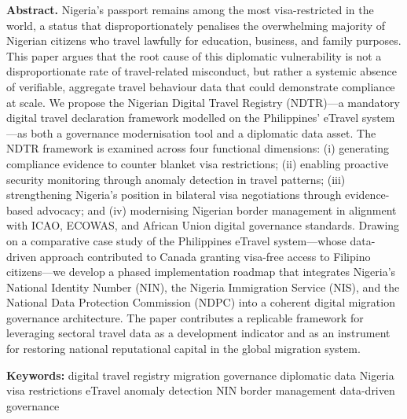 \documentclass[11pt]{article}
\begin{document}
\noindent\colorbox{primary-blue!7}{%
\begin{minipage}{\dimexpr\textwidth-2\fboxsep}
\vspace{6pt}
\textbf{\color{primary-blue}Abstract.}\quad
Nigeria's passport remains among the most visa-restricted in the world, a status that
disproportionately penalises the overwhelming majority of Nigerian citizens who travel
lawfully for education, business, and family purposes.
This paper argues that the root cause of this diplomatic vulnerability is not a
disproportionate rate of travel-related misconduct, but rather a systemic absence of
verifiable, aggregate travel behaviour data that could demonstrate compliance at scale.
We propose the Nigerian Digital Travel Registry (NDTR)---a mandatory digital travel
declaration framework modelled on the Philippines' eTravel system---as both a governance
modernisation tool and a diplomatic data asset.
The NDTR framework is examined across four functional dimensions:
(i) generating compliance evidence to counter blanket visa restrictions;
(ii) enabling proactive security monitoring through anomaly detection in travel patterns;
(iii) strengthening Nigeria's position in bilateral visa negotiations through
evidence-based advocacy; and
(iv) modernising Nigerian border management in alignment with ICAO, ECOWAS,
and African Union digital governance standards.
Drawing on a comparative case study of the Philippines eTravel system---whose
data-driven approach contributed to Canada granting visa-free access to Filipino
citizens---we develop a phased implementation roadmap that integrates Nigeria's
National Identity Number (NIN), the Nigeria Immigration Service (NIS), and the
National Data Protection Commission (NDPC) into a coherent digital migration
governance architecture.
The paper contributes a replicable framework for leveraging sectoral travel
data as a development indicator and as an instrument for restoring national
reputational capital in the global migration system.

\vspace{4pt}
\textbf{\color{primary-blue}Keywords:}\quad
digital travel registry \textbf{\textperiodcentered} migration governance
\textbf{\textperiodcentered} diplomatic data \textbf{\textperiodcentered} Nigeria
\textbf{\textperiodcentered} visa restrictions \textbf{\textperiodcentered} eTravel
\textbf{\textperiodcentered} anomaly detection \textbf{\textperiodcentered} NIN
\textbf{\textperiodcentered} border management \textbf{\textperiodcentered} data-driven governance
\vspace{6pt}
\end{minipage}}
\end{document}

